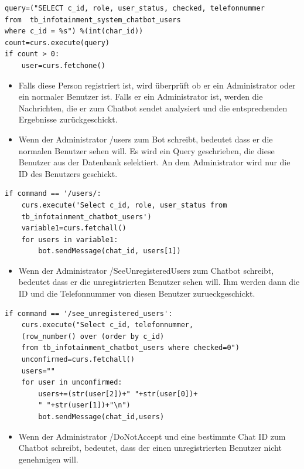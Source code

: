 \begin{lstlisting}[frame=single]
query=("SELECT c_id, role, user_status, checked, telefonnummer 
from  tb_infotainment_system_chatbot_users 
where c_id = %s") %(int(char_id))
count=curs.execute(query)
if count > 0:
	user=curs.fetchone()
\end{lstlisting}
\begin{itemize}
	\item Falls diese Person registriert ist, wird überprüft ob er ein Administrator oder ein normaler Benutzer ist. Falls er ein Administrator ist, werden die Nachrichten, die er zum Chatbot sendet analysiert und die entsprechenden Ergebnisse zurückgeschickt. 
\end{itemize}	
\begin{itemize}
	\item Wenn der Administrator /users zum Bot schreibt, bedeutet dass er die normalen Benutzer sehen will. Es wird ein Query geschrieben, die diese Benutzer aus der Datenbank selektiert. An dem Administrator wird nur die ID des Benutzers geschickt.
\end{itemize}
\begin{lstlisting}[frame=single]
if command == '/users/:
	curs.execute('Select c_id, role, user_status from 
	tb_infotainment_chatbot_users')
	variable1=curs.fetchall()
	for users in variable1:
		bot.sendMessage(chat_id, users[1])
\end{lstlisting}
\begin{itemize}
	\item Wenn der Administrator /SeeUnregisteredUsers zum Chatbot schreibt, bedeutet dass er die unregistrierten Benutzer sehen will. Ihm werden dann die ID und die Telefonnummer von diesen Benutzer zurueckgeschickt. 
\end{itemize}
\begin{lstlisting}[frame=single]
if command == '/see_unregistered_users':
	curs.execute("Select c_id, telefonnummer,
	(row_number() over (order by c_id) 
	from tb_infotainment_chatbot_users where checked=0")
	unconfirmed=curs.fetchall()
	users=""
	for user in unconfirmed:
		users+=(str(user[2])+" "+str(user[0])+
		" "+str(user[1])+"\n")
		bot.sendMessage(chat_id,users)
\end{lstlisting}
\begin{itemize}
	\item Wenn der Administrator /DoNotAccept und eine bestimmte Chat ID zum Chatbot schreibt, bedeutet, dass der einen unregistrierten Benutzer nicht genehmigen will. 
\end{itemize}	

